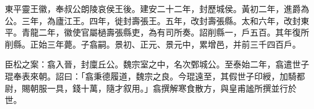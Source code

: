 
\begin{pinyinscope}
東平靈王徽，奉叔公朗陵哀侯王後。建安二十二年，封歷城侯。黃初二年，進爵為公。三年，為廬江王。四年，徙封壽張王。五年，改封壽張縣。太和六年，改封東平。青龍二年，徽使官屬檛壽張縣吏，為有司所奏。詔削縣一，戶五百。其年復所削縣。正始三年薨。子翕嗣。景初、正元、景元中，累增邑，并前三千四百戶。

臣松之案：翕入晉，封廩丘公。魏宗室之中，名次鄄城公。至泰始二年，翕遣世子琨奉表來朝。詔曰：「翕秉德履道，魏宗之良。今琨遠至，其假世子印綬，加騎都尉，賜朝服一具，錢十萬，隨才叙用。」翕撰解寒食散方，與皇甫謐所撰並行於世。


\end{pinyinscope}